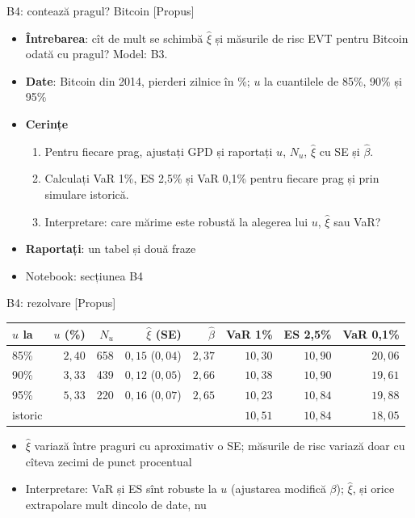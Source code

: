 \begin{frame}{B4: contează pragul? Bitcoin [Propus]}
\itemsize{\footnotesize}
\begin{itemize}
\item \textbf{Întrebarea}: cît de mult se schimbă $\hat\xi$ și măsurile de risc EVT pentru Bitcoin odată cu pragul? Model: B3.
\item \textbf{Date}: Bitcoin din 2014, pierderi zilnice în \%; $u$ la cuantilele de 85\%, 90\% și 95\%
\item \textbf{Cerințe}
\begin{enumerate}
    \item Pentru fiecare prag, ajustați GPD și raportați $u$, $N_u$, $\hat\xi$ cu SE și $\hat\beta$.
    \item Calculați VaR 1\%, ES 2,5\% și VaR 0,1\% pentru fiecare prag și prin simulare istorică.
    \item Interpretare: care mărime este robustă la alegerea lui $u$, $\hat\xi$ sau VaR?
\end{enumerate}
\item \textbf{Raportați}: un tabel și două fraze
\item Notebook: secțiunea B4
\end{itemize}
\end{frame}

\ifsolutions
\begin{frame}{B4: rezolvare [Propus]}
\itemsize{\footnotesize}
\begin{center}
\footnotesize
\begin{tabular}{lrrrrrrr}
\toprule
$u$ la & $u$ (\%) & $N_u$ & $\hat\xi$ (SE) & $\hat\beta$ & VaR 1\% & ES 2,5\% & VaR 0,1\% \\
\midrule
85\% & $2{,}40$ & 658 & $0{,}15$ ($0{,}04$) & $2{,}37$ & $10{,}30$ & $10{,}90$ & $20{,}06$ \\
90\% & $3{,}33$ & 439 & $0{,}12$ ($0{,}05$) & $2{,}66$ & $10{,}38$ & $10{,}90$ & $19{,}61$ \\
95\% & $5{,}33$ & 220 & $0{,}16$ ($0{,}07$) & $2{,}65$ & $10{,}23$ & $10{,}84$ & $19{,}88$ \\
istoric & & & & & $10{,}51$ & $10{,}84$ & $18{,}05$ \\
\bottomrule
\end{tabular}
\end{center}
\begin{itemize}
    \item $\hat\xi$ variază între praguri cu aproximativ o SE; măsurile de risc variază doar cu cîteva zecimi de punct procentual
    \item Interpretare: VaR și ES sînt robuste la $u$ (ajustarea modifică $\beta$); $\hat\xi$, și orice extrapolare mult dincolo de date, nu
\end{itemize}
\end{frame}
\fi

